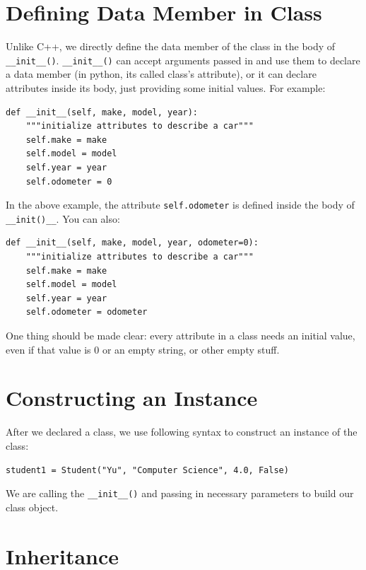 \documentclass[12pt]{book}
\begin{document}
\section{Defining Data Member in Class}
\label{sec:orgfbccc35}
Unlike C++, we directly define the data member of the class in the body of \texttt{\_\_init\_\_()}. \texttt{\_\_init\_\_()} can accept arguments passed in and use them to declare a data member (in python, its called class's attribute), or it can declare attributes inside its body, just providing some initial values. For example:
\begin{verbatim}
def __init__(self, make, model, year):
    """initialize attributes to describe a car"""
    self.make = make
    self.model = model
    self.year = year
    self.odometer = 0
\end{verbatim}
In the above example, the attribute \texttt{self.odometer} is defined inside the body of \texttt{\_\_init()\_\_}. You can also:
\begin{verbatim}
def __init__(self, make, model, year, odometer=0):
    """initialize attributes to describe a car"""
    self.make = make
    self.model = model
    self.year = year
    self.odometer = odometer
\end{verbatim}

One thing should be made clear: every attribute in a class needs an initial value, even if that value is 0 or an empty string, or other empty stuff.
\section{Constructing an Instance}
\label{sec:org8bf9c15}
After we declared a class, we use following syntax to construct an instance of the class:
\begin{verbatim}
student1 = Student("Yu", "Computer Science", 4.0, False)
\end{verbatim}
We are calling the \texttt{\_\_init\_\_()} and passing in necessary parameters to build our class object.
\section{Inheritance}
\label{sec:orgf0f81be}
\end{document}
